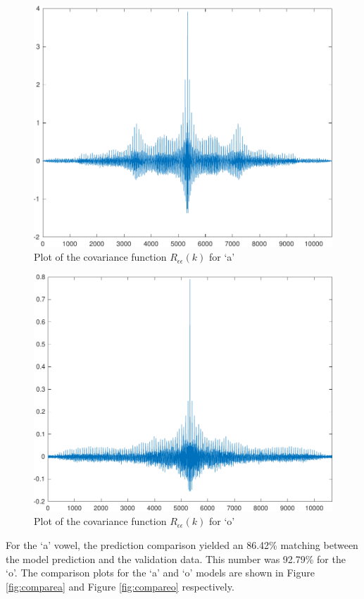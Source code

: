 \documentclass{IEEEtran}
\begin{document}
\begin{figure}[h!]
    \centering
    \captionsetup{justification=centering}
    \includegraphics[width=0.8\columnwidth]{pictures/acorr_a.pdf}
    \caption{Plot of the covariance function $R_{\epsilon\epsilon}(k)$ for `a'}
    \label{fig:acorra}
\end{figure}

\begin{figure}[h!]
    \centering
    \captionsetup{justification=centering}
    \includegraphics[width=0.8\columnwidth]{pictures/acorr_o.pdf}
    \caption{Plot of the covariance function $R_{\epsilon\epsilon}(k)$ for `o'}
    \label{fig:acorro}
\end{figure}

For the `a' vowel, the prediction comparison yielded an 86.42\% matching
between the model prediction and the validation data. This number was 92.79\%
for the `o'. The comparison plots for
the `a' and `o' models are shown in Figure \ref{fig:comparea} and Figure
\ref{fig:compareo} respectively.
\end{document}
